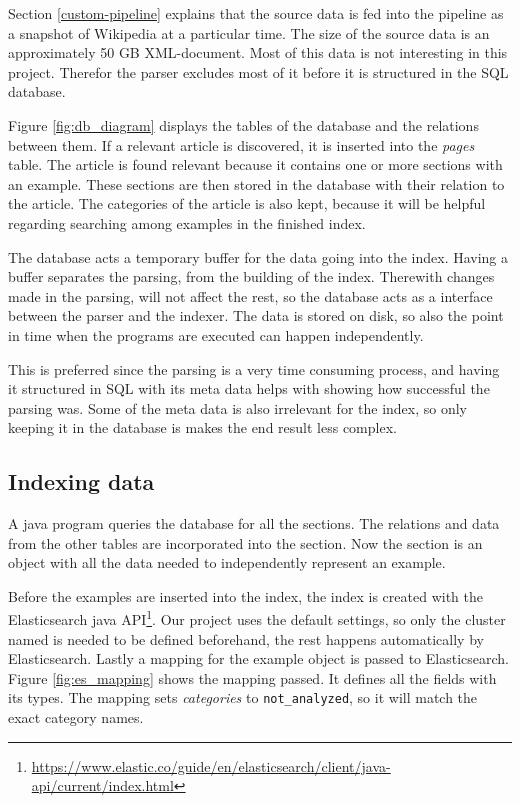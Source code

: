 
Section \ref{custom-pipeline} explains that the source data is fed into the pipeline as a snapshot of Wikipedia at a particular time. The size of the source data is an approximately 50 GB XML-document. Most of this data is not interesting in this project. Therefor the parser excludes most of it before it is structured in the SQL database. 

Figure \ref{fig:db_diagram} displays the tables of the database and the relations between them. If a relevant article is discovered, it is inserted into the \textit{pages} table. The article is found relevant because it contains one or more sections with an example. These sections are then stored in the database with their relation to the article. The categories of the article is also kept, because it will be helpful regarding searching among examples in the finished index.  

The database acts a temporary buffer for the data going into the index. Having a buffer separates the parsing, from the building of the index. Therewith changes made in the parsing, will not affect the rest, so the database acts as a interface between the parser and the indexer. The data is stored on disk, so also the point in time when the programs are executed can happen independently.

This is preferred since the parsing is a very time consuming process, and having it structured in SQL with its meta data helps with showing how successful the parsing was. Some of the meta data is also irrelevant for the index, so only keeping it in the database is makes the end result less complex.


\subsection{Indexing data}
A java program queries the database for all the sections. The relations and data from the other tables are incorporated into the section. Now the section is an object with all the data needed to independently represent an example.

Before the examples are inserted into the index, the index is created with the Elasticsearch java API\footnote{\url{https://www.elastic.co/guide/en/elasticsearch/client/java-api/current/index.html}}. Our project uses the default settings, so only the cluster named is needed to be defined beforehand, the rest happens automatically by Elasticsearch. Lastly a mapping for the example object is passed to Elasticsearch. Figure \ref{fig:es_mapping} shows the mapping passed. It defines all the fields with its types. The mapping sets \textit{categories} to \texttt{not\_analyzed}, so it will match the exact category names.

